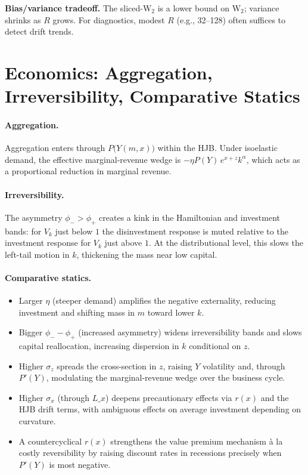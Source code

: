 ﻿\documentclass[11pt,letterpaper,oneside]{article}
\numberwithin{equation}{section}
\newcommand{\1}{\mathbf{1}}
\newcommand{\Lx}{L\_x}
\begin{document}
\begin{tcolorbox}[didacticstyle]
\begin{itemize}[leftmargin=1.1em,itemsep=0.25em]
\begin{tcolorbox}[mathstyle]
\textbf{Bias/variance tradeoff.} The sliced-$\mathrm W_2$ is a lower bound on $\mathrm W_2$; variance shrinks as $R$ grows. For diagnostics, modest $R$ (e.g., 32--128) often suffices to detect drift trends.
\end{tcolorbox}

\section{Economics: Aggregation, Irreversibility, Comparative Statics}

\paragraph{Aggregation.}
Aggregation enters through $P\big(Y(m,x)\big)$ within the HJB. Under isoelastic demand, the effective marginal-revenue wedge is $-\eta P(Y)\,e^{x+z}k^\alpha$, which acts as a proportional reduction in marginal revenue.

\paragraph{Irreversibility.}
The asymmetry $\phi_->\phi_+$ creates a kink in the Hamiltonian and investment bands: for $V_k$ just below $1$ the disinvestment response is muted relative to the investment response for $V_k$ just above $1$. At the distributional level, this slows the left-tail motion in $k$, thickening the mass near low capital.

\paragraph{Comparative statics.}
\begin{itemize}[leftmargin=1.25em]
\item Larger $\eta$ (steeper demand) amplifies the negative externality, reducing investment and shifting mass in $m$ toward lower $k$.
\item Bigger $\phi_- - \phi_+$ (increased asymmetry) widens irreversibility bands and slows capital reallocation, increasing dispersion in $k$ conditional on $z$.
\item Higher $\sigma_z$ spreads the cross-section in $z$, raising $Y$ volatility and, through $P'(Y)$, modulating the marginal-revenue wedge over the business cycle.
\item Higher $\sigma_x$ (through $\Lx$) deepens precautionary effects via $r(x)$ and the HJB drift terms, with ambiguous effects on average investment depending on curvature.
\item A countercyclical $r(x)$ strengthens the value premium mechanism à la costly reversibility by raising discount rates in recessions precisely when $P'(Y)$ is most negative.
\end{itemize}


\end{itemize}
\end{tcolorbox}
\end{document}
